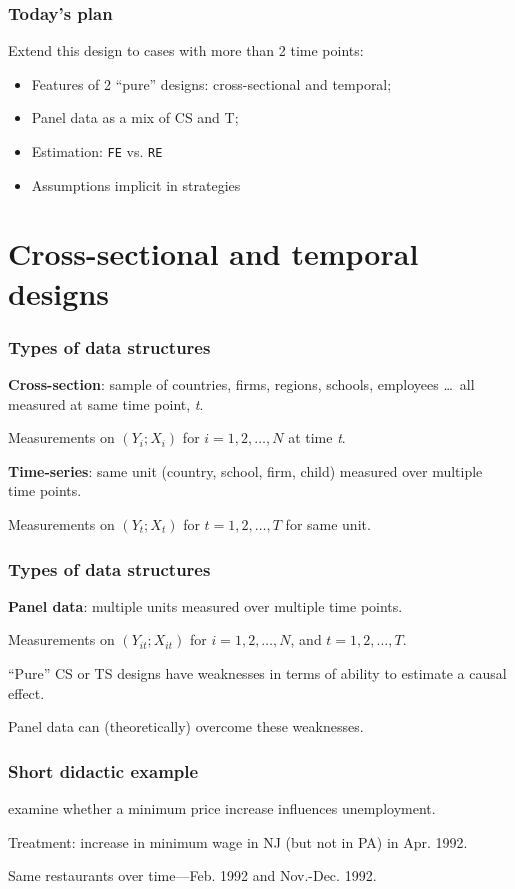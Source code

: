 \documentclass[11pt,english,dvipsnames,aspectratio=169,handout]{beamer}\usepackage[]{graphicx}\usepackage[]{xcolor}
\begin{document}
\begin{frame}
	\frametitle{Today's plan}
	Extend this design to cases with more than 2 time points:
	
	\begin{itemize}
	\setlength\itemsep{1.5em}
	\item Features of 2 ``pure'' designs: cross-sectional and temporal;
	\item Panel data as a mix of CS and T;
	\item Estimation: \texttt{FE} vs. \texttt{RE}
	\item Assumptions implicit in strategies
	\end{itemize}
	
\end{frame}


\section{Cross-sectional and temporal designs}

\begin{frame}
  \frametitle{Types of data structures}
  \textbf{Cross-section}: sample of countries, firms, regions, schools, employees \dots\ all measured at same time point, \textit{t}.
  
  Measurements on $(Y_i; X_i)$ for $i = 1, 2, \dots, N$ at time \textit{t}.\bigskip
  \pause
  
  \textbf{Time-series}: same unit (country, school, firm, child) measured over multiple time points.
  
  Measurements on $(Y_t; X_t)$ for $t = 1, 2, \dots, T$ for same unit.
  
\end{frame}


\begin{frame}
  \frametitle{Types of data structures}
  \textbf{Panel data}: multiple units measured over multiple time points.
  
  Measurements on $(Y_{it}; X_{it})$ for $i = 1, 2, \dots, N$, and $t = 1, 2, \dots, T$.\bigskip
  \pause
  
  ``Pure'' CS or TS designs have weaknesses in terms of ability to estimate a causal effect.\bigskip
  
  Panel data can (theoretically) overcome these weaknesses.
  
\end{frame}

\begin{frame}
  \frametitle{Short didactic example}
   examine whether a minimum price increase influences unemployment.\bigskip
  \pause

  Treatment: increase in minimum wage in NJ (but not in PA) in Apr. 1992.



  Same restaurants over time---Feb. 1992 and Nov.-Dec. 1992.

\end{frame}
\end{document}

